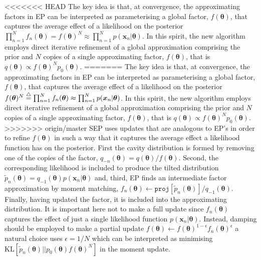 <<<<<<< HEAD
The key idea is that, at convergence, the approximating factors in EP can be interpreted as parameterising a global factor,  $f(\bm{\theta})$, that captures the average effect of a likelihood on the posterior  $\prod_{n=1}^{N} f_n(\bm{\theta}) = f(\bm{\theta})^{N} \approx \prod_{n=1}^{N} p(\bm{x}_n | \bm{\theta})$. In this spirit, the new algorithm employs direct iterative refinement of a global approximation comprising the prior and $N$ copies of a single approximating factor, $f(\bm{\theta})$, that is $q(\bm{\theta}) \propto f(\bm{\theta})^N p_0(\bm{\theta})$.
=======
The key idea is that, at convergence, the approximating factors in EP can be interpreted as parameterising a global factor,  $f(\bm{\theta})$, that captures the average effect of a likelihood on the posterior  $f(\bm{\theta})^{N} \buildrel\triangle\over = \prod_{n=1}^{N} f_n(\bm{\theta}) \approx \prod_{n=1}^{N} p(\bm{x}_n | \bm{\theta})$. In this spirit, the new algorithm employs direct iterative refinement of a global approximation comprising the prior and $N$ copies of a single approximating factor, $f(\bm{\theta})$, that is $q(\bm{\theta}) \propto f(\bm{\theta})^N p_0(\bm{\theta})$.
>>>>>>> origin/master
%
%
SEP uses updates that are analogous to EP's in order to refine $f(\bm{\theta})$ in such a way that it captures the average effect a likelihood function has on the posterior. First the cavity distribution is formed by removing one of the copies of the factor, $q_{-n}(\bm{\theta}) =q(\bm{\theta})/f(\bm{\theta})$. 
Second, the corresponding likelihood is included to produce the tilted distribution $\tilde{p}_n(\bm{\theta}) = q_{-1}(\bm{\theta}) p(\bm{x}_n | \bm{\theta})$ and, third, EP finds an intermediate factor approximation by moment matching, $f_n(\bm{\theta}) \leftarrow \mathtt{proj}[\tilde{p}_n(\bm{\theta})] / q_{-1}(\bm{\theta}) $. Finally, having updated the factor, it is included into the approximating distribution. It is important here not to make a full update since $f_n(\bm{\theta})$ captures the effect of just a single likelihood function  $p(\bm{x}_n | \bm{\theta})$. Instead, damping should be employed to make a partial update $f(\bm{\theta}) \leftarrow f(\bm{\theta})^{1 - \epsilon} f_n(\bm{\theta})^{\epsilon}$ a natural choice uses $\epsilon = 1/N$ which can be interpreted as minimising  $\mathrm{KL}[\tilde{p}_n(\bm{\theta}) || p_{0}(\bm{\theta})  f(\bm{\theta})^N]$ in the moment update.


